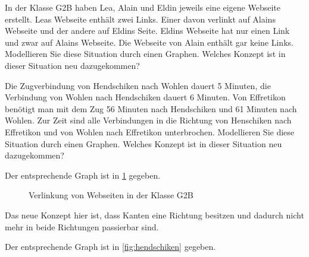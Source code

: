 \begin{myexercise}\label{myexercise:02}
	\begin{aenum}
		\item In der Klasse G2B haben Lea, Alain und Eldin jeweils eine eigene Webseite erstellt. Leas Webseite enthält zwei Links. Einer davon verlinkt auf Alains Webseite und der andere auf Eldins Seite. Eldins Webseite hat nur einen Link und zwar auf Alains Webseite. Die Webseite von Alain enthält gar keine Links. Modellieren Sie diese Situation durch einen Graphen. Welches Konzept ist in dieser Situation neu dazugekommen?
		\item Die Zugverbindung von Hendschiken nach Wohlen dauert 5 Minuten, die Verbindung von Wohlen nach Hendschiken dauert 6 Minuten. Von Effretikon benötigt man mit dem Zug 56 Minuten nach Hendschiken und 61 Minuten nach Wohlen. Zur Zeit sind alle Verbindungen in die Richtung von Henschiken nach Effretikon und von Wohlen nach Effretikon unterbrochen. Modellieren Sie diese Situation durch einen Graphen. Welches Konzept ist in dieser Situation neu dazugekommen?
	\end{aenum}
	\begin{myanswer}\label{myexercise:02-sol}
		\begin{aenum}
			\item Der entsprechende Graph ist in \cref{fig:webseiten} gegeben.
			\begin{figure}[H]
				\centering
				\caption{Verlinkung von Webseiten in der Klasse G2B}
				\label{fig:webseiten}
			\end{figure}
			\noindent
			Das neue Konzept hier ist, dass Kanten eine Richtung besitzen und dadurch nicht mehr in beide Richtungen passierbar sind.
			\item Der entsprechende Graph ist in \cref{fig:hendschiken} gegeben.

\end{aenum}
\end{myanswer}
\end{myexercise}
